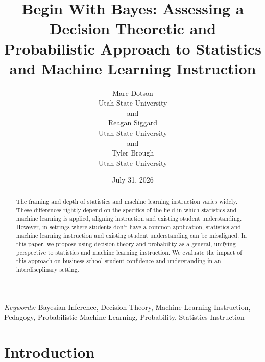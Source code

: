 \documentclass[
  12pt]{article}
\begin{document}
\def\spacingset#1{\renewcommand{\baselinestretch}%
{#1}\small\normalsize} \spacingset{1}



\date{July 31, 2026}
\title{\bf Begin With Bayes: Assessing a Decision Theoretic and
Probabilistic Approach to Statistics and Machine Learning Instruction}
\author{
Marc Dotson\\
Utah State University\\
and\\Reagan Siggard\\
Utah State University\\
and\\Tyler Brough\\
Utah State University\\
}
\maketitle

\bigskip
\bigskip
\begin{abstract}
The framing and depth of statistics and machine learning instruction
varies widely. These differences rightly depend on the specifics of the
field in which statistics and machine learning is applied, aligning
instruction and existing student understanding. However, in settings
where students don't have a common application, statistics and machine
learning instruction and existing student understanding can be
misaligned. In this paper, we propose using decision theory and
probability as a general, unifying perspective to statistics and machine
learning instruction. We evaluate the impact of this approach on
business school student confidence and understanding in an
interdiscplinary setting.
\end{abstract}

\noindent%
{\it Keywords:} Bayesian Inference, Decision Theory, Machine Learning
Instruction, Pedagogy, Probabilistic Machine
Learning, Probability, Statistics Instruction
\vfill

\newpage
\spacingset{1.9} %


\section{Introduction}\label{sec-intro}
\end{document}
